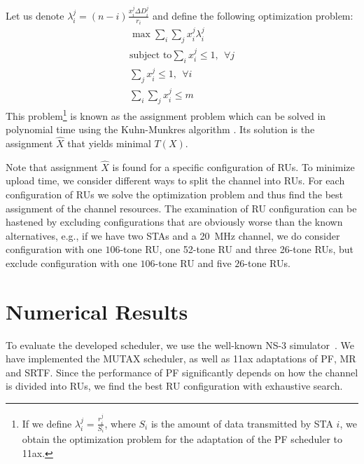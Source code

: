 Let us denote $\lambda_i^j = \left(n - i\right) \frac{x_i^j \Delta D_i^j}{r_{i}}$ and define the following optimization problem:
\begin{align*}
	\max \sum_{i} \sum_{j} x_i^j \lambda_i^j \\
	\text{subject to} \sum_{i} x_i^j \leq 1,\ \  \forall j \\
	\sum_{j} x_i^j \leq 1, \ \ \forall i \\
	\sum_{i} \sum_{j} x_i^j \leq m
\end{align*}
This problem\footnote{If we define $\lambda_i^j = \frac{r_i^j}{S_i}$, where $S_i$ is the amount of data transmitted by STA $i$, we obtain the optimization problem for the adaptation of the PF scheduler to 11ax.} is known as the assignment problem which can be solved in polynomial time using the Kuhn-Munkres algorithm \cite{bourgeois1971extension}.
Its solution is the assignment $\hat X$ that yields minimal $T(X)$.

Note that assignment $\hat X$ is found for a specific configuration of RUs.
To minimize upload time, we consider different ways to split the channel into RUs. For each configuration of RUs we solve the optimization problem and thus find the best assignment of the channel resources.
The examination of RU configuration can be hastened by excluding configurations that are obviously worse than the known alternatives, e.g., if we have two STAs and a \SI{20}{\MHz} channel, we do consider configuration with one $106$-tone RU, one 52-tone RU and three 26-tone RUs, but exclude configuration with one $106$-tone RU and five $26$-tone RUs.

\section{Numerical  Results}
To evaluate the developed scheduler, we use  the well-known NS-3 simulator~\cite{ns-3}.
We have implemented the MUTAX scheduler, as well as 11ax adaptations of PF, MR and SRTF.
Since the performance of PF significantly depends on how the channel is divided into RUs, we find the best RU configuration with exhaustive search.

